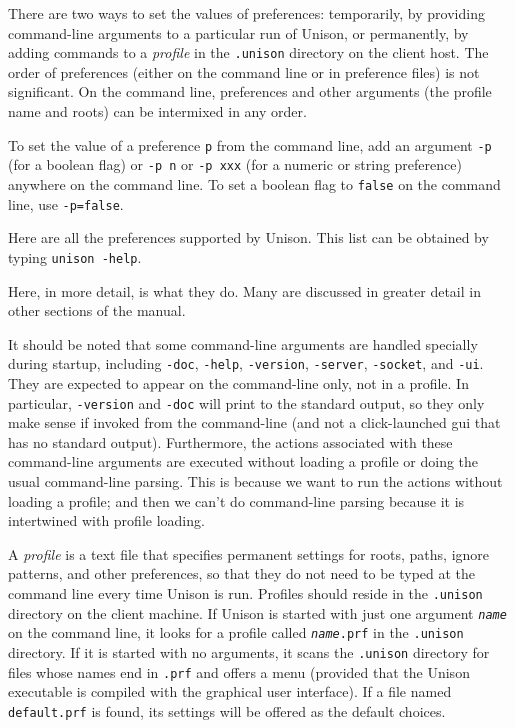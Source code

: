 \documentclass{article}
\newcommand{\ARG}[1]{\texttt{\textit{#1}}}
\begin{document}
There are two ways to set the values of preferences: temporarily, by
providing command-line arguments to a particular run of Unison, or
permanently, by adding commands to a {\em profile} in the {\tt .unison}
directory on the client host.  The order of preferences (either on the
command line or in preference files) is not significant.  On the command
line, preferences and other arguments (the profile name and roots) can be
intermixed in any order.

To set the value of a preference {\tt p} from the command line, add an
argument {\tt -p} (for a boolean flag) or {\tt -p n} or {\tt -p xxx} (for
a numeric or string preference) anywhere on the command line.  To set a
boolean flag to \verb|false| on the command line, use {\tt -p=false}.

Here are all the preferences supported by Unison.  This list can be
  obtained by typing {\tt unison -help}.
\begin{quote}

\end{quote}
Here, in more detail, is what they do.  Many are discussed in greater detail
in other sections of the manual.

It should be noted that some command-line arguments are handled specially during startup, including \verb|-doc|, \verb|-help|, \verb|-version|, \verb|-server|, \verb|-socket|, and \verb|-ui|. They are expected to appear on the command-line only, not in a profile. In particular, \verb|-version| and \verb|-doc| will print to the standard output, so they only make sense if invoked from the command-line (and not a click-launched gui that has no standard output). Furthermore, the actions associated with these command-line arguments are executed without loading a profile or doing the usual command-line parsing. This is because we want to run the actions without loading a profile; and then we can't do command-line parsing because it is intertwined with profile loading.
%




A {\em profile} is a text file that specifies permanent settings for
roots, paths, ignore patterns, and other preferences, so that they do
not need to be typed at the command line every time Unison is run.
Profiles should reside in the \verb|.unison| directory on the client
machine.  If Unison is started with just one argument \ARG{name} on
the command line, it looks for a profile called \texttt{\ARG{name}.prf} in
the \verb|.unison| directory.  If it is started with no arguments, it
scans the \verb|.unison| directory for files whose names end in
\verb|.prf| and offers a menu (provided that the Unison executable is compiled with the graphical user interface).  If a file named \verb|default.prf| is
found, its settings will be offered as the default choices.
\end{document}

